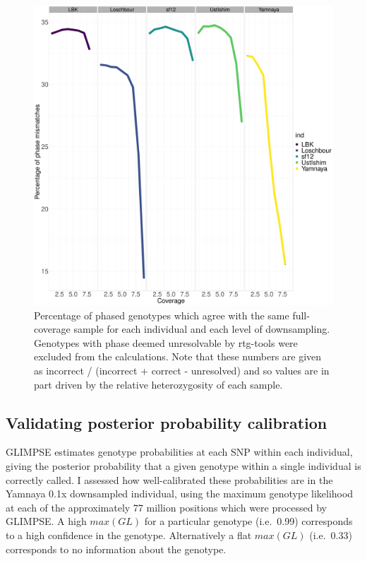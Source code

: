 \begin{figure}[htp]
    \centering
    \includegraphics[width=1.0\textwidth]{../images/chapter1/phasing_performance_downsampled.pdf}
    \caption{Percentage of phased genotypes which agree with the same full-coverage sample for each individual and each level of downsampling. Genotypes with phase deemed unresolvable by rtg-tools were excluded from the calculations. Note that these numbers are given as incorrect / (incorrect + correct - unresolved) and so values are in part driven by the relative heterozygosity of each sample.}
    \label{fig:phasing_performance_downsampled}
\end{figure}

\subsection{Validating posterior probability calibration}

GLIMPSE estimates genotype probabilities at each SNP within each individual, giving the posterior probability that a given genotype within a single individual is correctly called. I assessed how well-calibrated these probabilities are in the Yamnaya 0.1x downsampled individual, using the maximum genotype likelihood at each of the approximately 77 million positions which were processed by GLIMPSE. A high $max(GL)$ for a particular genotype (i.e.\ 0.99) corresponds to a high confidence in the genotype. Alternatively a flat $max(GL)$ (i.e.\ 0.33) corresponds to no information about the genotype. 

